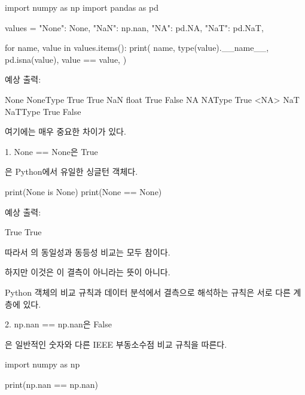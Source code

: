 \begin{dhkcode}
import numpy as np
import pandas as pd

values = {
    "None": None,
    "NaN": np.nan,
    "NA": pd.NA,
    "NaT": pd.NaT,
}

for name, value in values.items():
    print(
        name,
        type(value).__name__,
        pd.isna(value),
        value == value,
    )
\end{dhkcode}

예상 출력:

\begin{dhkzsh}
None NoneType True True
NaN float True False
NA NAType True <NA>
NaT NaTType True False
\end{dhkzsh}

여기에는 매우 중요한 차이가 있다.

\begin{dhknote}
\begin{dhksmry}[centered]
1. None == None은 True
\end{dhksmry}
\end{dhknote}

은 Python에서 유일한 싱글턴 객체다.

\begin{dhkcode}
print(None is None)
print(None == None)
\end{dhkcode}

예상 출력:

\begin{dhkzsh}
True
True
\end{dhkzsh}

따라서 의 동일성과 동등성 비교는 모두 참이다.

하지만 이것은 이 결측이 아니라는 뜻이 아니다.

Python 객체의 비교 규칙과 데이터 분석에서 결측으로 해석하는 규칙은 서로 다른 계층에 있다.

\begin{dhknote}
\begin{dhksmry}[centered]
2. np.nan == np.nan은 False
\end{dhksmry}
\end{dhknote}

은 일반적인 숫자와 다른 IEEE 부동소수점 비교 규칙을 따른다.

\begin{dhkcode}
import numpy as np

print(np.nan == np.nan)
\end{dhkcode}

